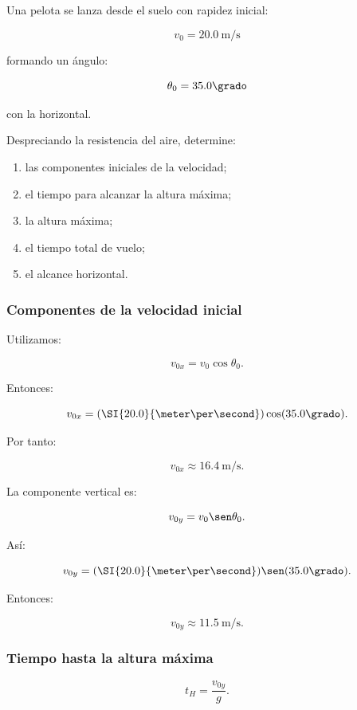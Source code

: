 \begin{ejemplo}
Una pelota se lanza desde el suelo con rapidez inicial:

\[
v_0=\SI{20.0}{\meter\per\second}
\]

formando un ángulo:

\[
\theta_0=35.0\grado
\]

con la horizontal.

Despreciando la resistencia del aire, determine:

\begin{enumerate}[label=\alph*)]
    \item las componentes iniciales de la velocidad;
    \item el tiempo para alcanzar la altura máxima;
    \item la altura máxima;
    \item el tiempo total de vuelo;
    \item el alcance horizontal.
\end{enumerate}
\end{ejemplo}


\subsubsection*{Componentes de la velocidad inicial}

Utilizamos:

\[
v_{0x}=v_0\cos\theta_0.
\]

Entonces:

\[
v_{0x}
=
(\SI{20.0}{\meter\per\second})
\cos(35.0\grado).
\]

Por tanto:

\[
\boxed{
v_{0x}\approx\SI{16.4}{\meter\per\second}
}.
\]

La componente vertical es:

\[
v_{0y}=v_0\sen\theta_0.
\]

Así:

\[
v_{0y}
=
(\SI{20.0}{\meter\per\second})
\sen(35.0\grado).
\]

Entonces:

\[
\boxed{
v_{0y}\approx\SI{11.5}{\meter\per\second}
}.
\]


\subsubsection*{Tiempo hasta la altura máxima}

\[
t_H
=
\frac{v_{0y}}{g}.
\]

